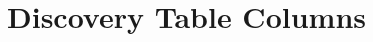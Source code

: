\documentclass[conference]{IEEEtran}
\begin{document}






\FloatBarrier

\appendices
\label{app:appendices}

\section{Discovery Table Columns}
\label{app:columns}
\end{document}
